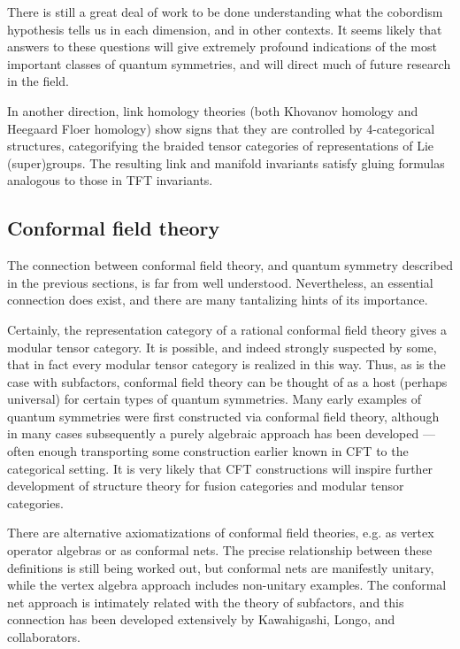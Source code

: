 \documentclass[12pt]{article}
\begin{document}
There is still a great deal of work to be done understanding what the cobordism hypothesis tells us in each dimension, and in other contexts. It seems likely that answers to these questions will give extremely profound indications of the most important classes of quantum symmetries, and will direct much of future research in the field.

In another direction, link homology theories (both Khovanov homology and Heegaard Floer homology) show signs that they are controlled by 4-categorical structures, categorifying the braided tensor categories of representations of Lie (super)groups. The resulting link and manifold invariants satisfy gluing formulas analogous to those in TFT invariants. 

\subsection{Conformal field theory}
The connection between conformal field theory, and quantum symmetry described in the previous sections, is far from well understood. Nevertheless, an essential connection does exist, and there are many tantalizing hints of its importance.

Certainly, the representation category of a rational conformal field theory gives a modular tensor category. It is possible, and indeed strongly suspected by some, that in fact every modular tensor category is realized in this way. Thus, as is the case with subfactors, conformal field theory can be thought of as a host (perhaps universal) for certain types of quantum symmetries. Many early examples of quantum symmetries were first constructed via conformal field theory, although in many cases subsequently a purely algebraic approach has been developed --- often enough transporting some construction earlier known in CFT to the categorical setting. It is very likely that CFT constructions will inspire further development of structure theory for fusion categories and modular tensor categories.

There are alternative axiomatizations of conformal field theories, e.g.  as vertex operator algebras or as conformal nets. The precise relationship between these definitions is still being worked out, but conformal nets are manifestly unitary, while the vertex algebra approach includes non-unitary examples. The conformal net approach is intimately related with the theory of subfactors, and this connection has been developed extensively by Kawahigashi, Longo, and collaborators.
\end{document}
